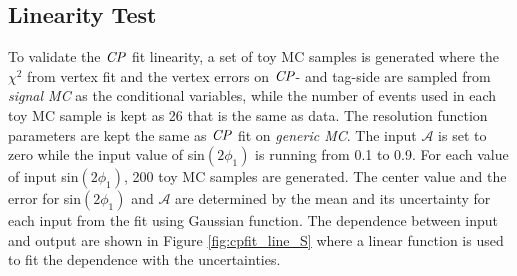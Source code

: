 \subsection{Linearity Test}
To validate the $\it{CP}$ fit linearity, a set of toy MC samples is generated where the $\chi^2$ from vertex fit and the vertex errors on $\it{CP}$- and tag-side are sampled from \textit{signal MC} as the conditional variables, while the number of events used in each toy MC sample is kept as 26 that is the same as data. The resolution function parameters are kept the same as $\it{CP}$ fit on \textit{generic MC}. The input $\mathcal{A}$ is set to zero while the input value of sin$(2\phi_1)$ is running from 0.1 to 0.9. For each value of input sin$(2\phi_1)$, 200 toy MC samples are generated. The center value and the error for sin$(2\phi_1)$ and $\mathcal{A}$ are determined by the mean and its uncertainty for each input from the fit using Gaussian function.
The dependence between input and output are shown in Figure \ref{fig:cpfit_line_S} where a linear function is used to fit the dependence with the uncertainties.
